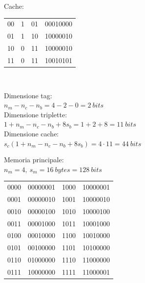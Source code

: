 \documentclass[12pt,a4paper]{article}
\begin{document}
\Sep
\begin{minipage}{.45\linewidth}
Cache:
\begin{center}
\begin{tabular}{llll}
00 & {\color[HTML]{3166FF} 1} & {\color[HTML]{3166FF} 01} & {\color[HTML]{3166FF} 00010000} \\
01 & {\color[HTML]{3166FF} 1} & {\color[HTML]{3166FF} 10} & {\color[HTML]{3166FF} 10000010} \\
10 & {\color[HTML]{3166FF} 0} & {\color[HTML]{3166FF} 11} & {\color[HTML]{3166FF} 10000010} \\
11 & {\color[HTML]{3166FF} 0} & {\color[HTML]{3166FF} 11} & {\color[HTML]{3166FF} 10010101}
\end{tabular}\\
\end{center}
Dimensione tag:\\ $n_m - n_c - n_b = 4 - 2 - 0 = 2\ bits$\\
Dimensione triplette:\\ $1+n_m - n_c-n_b + 8s_b = 1+2+8 = 11\ bits$\\
Dimensione cache:\\ $s_c(1+n_m - n_c-n_b + 8s_b) = 4\cdot 11= 44\ bits$\\
\end{minipage}
\begin{minipage}{.45\linewidth}
Memoria principale:\\
$n_m = 4,\ s_m =16\ bytes = 128\ bits$\\
\begin{center}
\begin{tabular}{llll}
0000 & {\color[HTML]{3166FF} 00000001} & 1000 & {\color[HTML]{3166FF} 10000001} \\
0001 & {\color[HTML]{3166FF} 00000010} & 1001 & {\color[HTML]{3166FF} 10000010} \\
0010 & {\color[HTML]{3166FF} 00000100} & 1010 & {\color[HTML]{3166FF} 10000100} \\
0011 & {\color[HTML]{3166FF} 00001000} & 1011 & {\color[HTML]{3166FF} 10001000} \\
0100 & {\color[HTML]{3166FF} 00010000} & 1100 & {\color[HTML]{3166FF} 10010000} \\
0101 & {\color[HTML]{3166FF} 00100000} & 1101 & {\color[HTML]{3166FF} 10100000} \\
0110 & {\color[HTML]{3166FF} 01000000} & 1110 & {\color[HTML]{3166FF} 11000000} \\
0111 & {\color[HTML]{3166FF} 10000000} & 1111 & {\color[HTML]{3166FF} 11000001}
\end{tabular}
\end{center}
\end{minipage}
\end{document}

